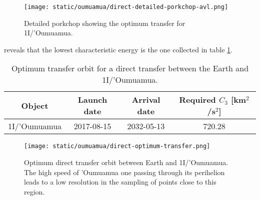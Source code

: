\begin{figure}[H]
  \centering
  \texttt{[image: static/oumuamua/direct-detailed-porkchop-avl.png]}
        \caption[Detailed porkchop showing the optimum transfer for
        1I/'Oumuamua with the arrival velocity.]{Detailed porkchop showing the optimum transfer for
        1I/'Oumuamua.}
  \label{fig:oumuamua-optimum-porkchop-avl}
\end{figure}































\newpage






reveals that the lowest
characteristic energy is the one collected in table \ref{tab:oumua-direct-transfer-optimum}.

\vspace{0.5cm}
\begin{table}[H]
  \centering
  \begin{tabular}{|c|c|c|c|}
    \hline
    Object & Launch date & Arrival date & Required $C_3$ [km$^2$/s$^2$] \\
    \hline
    1I/'Oumuamua & 2017-08-15 & 2032-05-13 & 720.28 \\
    \hline
  \end{tabular}
  \caption{Optimum transfer orbit for a direct transfer between the Earth and 1I/'Oumuamua.}
  \label{tab:oumua-direct-transfer-optimum}
\end{table}

\begin{figure}[H]
  \centering
  \texttt{[image: static/oumuamua/direct-optimum-transfer.png]}
  \caption{Optimum direct transfer orbit between Earth and 1I/'Oumuamua. The
    high speed of 'Oumuamua one passing through its perihelion leads to a low
    resolution in the sampling of points close to this region.}
  \label{fig:oumuamua-direct-transfer-orbit}
\end{figure}

